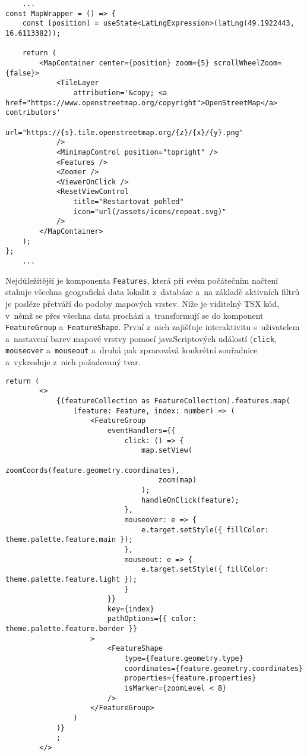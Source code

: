 \begin{verbatim}
    ...
const MapWrapper = () => {
    const [position] = useState<LatLngExpression>(latLng(49.1922443, 16.6113382));

    return (
        <MapContainer center={position} zoom={5} scrollWheelZoom={false}>
            <TileLayer
                attribution='&copy; <a href="https://www.openstreetmap.org/copyright">OpenStreetMap</a> contributors'
                url="https://{s}.tile.openstreetmap.org/{z}/{x}/{y}.png"
            />
            <MinimapControl position="topright" />
            <Features />
            <Zoomer />
            <ViewerOnClick />
            <ResetViewControl
                title="Restartovat pohled"
                icon="url(/assets/icons/repeat.svg)"
            />
        </MapContainer>
    );
};
    ...
    \end{verbatim}

Nejdůležitější je komponenta \verb|Features|, která při svém počátečním načtení stahuje všechna geografická data lokalit z~databáze a~na základě aktivních filtrů je posléze přetváří do podoby mapových vrstev. Níže je viditelný TSX kód, v~němž se přes všechna data prochází a~transformují se do komponent \verb|FeatureGroup| a~\verb|FeatureShape|. První z~nich zajišťuje interaktivitu s~uživatelem a~nastavení barev mapové vrstvy pomocí javaScriptových událostí (\verb|click|, \verb|mouseover| a~\verb|mouseout| a~druhá pak zpracovává konkrétní souřadnice a~vykresluje z~nich požadovaný tvar.

\begin{verbatim}
return (
        <>
            {(featureCollection as FeatureCollection).features.map(
                (feature: Feature, index: number) => (
                    <FeatureGroup
                        eventHandlers={{
                            click: () => {
                                map.setView(
                                    zoomCoords(feature.geometry.coordinates),
                                    zoom(map)
                                );
                                handleOnClick(feature);
                            },
                            mouseover: e => {
                                e.target.setStyle({ fillColor: theme.palette.feature.main });
                            },
                            mouseout: e => {
                                e.target.setStyle({ fillColor: theme.palette.feature.light });
                            }
                        }}
                        key={index}
                        pathOptions={{ color: theme.palette.feature.border }}
                    >
                        <FeatureShape
                            type={feature.geometry.type}
                            coordinates={feature.geometry.coordinates}
                            properties={feature.properties}
                            isMarker={zoomLevel < 8}
                        />
                    </FeatureGroup>
                )
            )}
            ;
        </>
    \end{verbatim}
